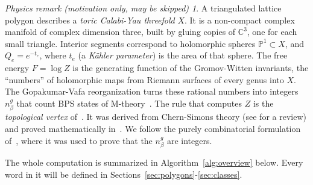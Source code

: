 \documentclass[11pt]{article}
\theoremstyle{plain}
\theoremstyle{definition}
\theoremstyle{remark}
\newtheorem*{physrem}{Physics remark (motivation only, may be skipped)}
\newcommand{\C}{\mathbb{C}}
\newcommand{\PP}{\mathbb{P}}
\begin{document}
\begin{physrem}
A triangulated lattice polygon describes a \textit{toric Calabi-Yau threefold} $X$. It is a
non-compact complex manifold of complex dimension three, built by gluing copies of $\C^3$, one
for each small triangle. Interior segments correspond to holomorphic spheres $\PP^1\subset X$,
and $Q_e=e^{-t_e}$, where $t_e$ (a \textit{K\"ahler parameter}) is the area of that sphere. The
free energy $F=\log Z$ is the generating function of the Gromov-Witten invariants, the
``numbers'' of holomorphic maps from Riemann surfaces of every genus into $X$. The
Gopakumar-Vafa reorganization turns these rational numbers into integers $n^g_\beta$ that count
BPS states of M-theory~\cite{GV}. The rule that computes $Z$ is the \textit{topological vertex}
of~\cite{AKMV}. It was derived from Chern-Simons theory (see \cite{Marino} for a review) and
proved mathematically in~\cite{LLLZ}. We follow the purely combinatorial formulation
of~\cite{Kon}, where it was used to prove that the $n^g_\beta$ are integers.
\end{physrem}

The whole computation is summarized in Algorithm~\ref{alg:overview} below. Every word in it
will be defined in Sections~\ref{sec:polygons}-\ref{sec:classes}.
\end{document}
